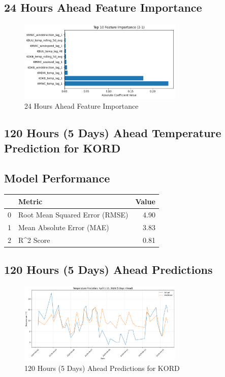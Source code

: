 \subsection{24 Hours Ahead Feature Importance}
\begin{figure}[htbp]
\centering
\includegraphics[width=0.7\textwidth]{2-1-gradient_boost_temp_shift_feature_importance.png}
\caption{24 Hours Ahead Feature Importance}
\label{fig:24_hours_ahead_featimp}
\end{figure}



\subsection{120 Hours (5 Days) Ahead Temperature Prediction for KORD}
\subsection{Model Performance}
\begin{tabular}{llr}
\toprule
 & Metric & Value \\
\midrule
0 & Root Mean Squared Error (RMSE) & 4.90 \\
1 & Mean Absolute Error (MAE) & 3.83 \\
2 & R^2 Score & 0.81 \\
\bottomrule
\end{tabular}

\subsection{120 Hours (5 Days) Ahead Predictions}
\begin{figure}[htbp]
\centering
\includegraphics[width=0.7\textwidth]{2-2-gradient_boost_temp_shift_results.png}
\caption{120 Hours (5 Days) Ahead Predictions for KORD}
\label{fig:120_hours_(5_days)_ahead_pred}
\end{figure}

